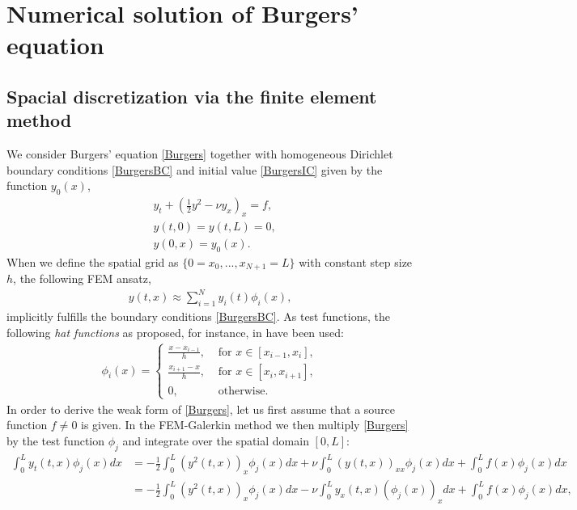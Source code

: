 \chapter{Numerical solution of Burgers' equation}
\label{FEMDiscr}
\section{Spacial discretization via the finite element method}
\label{FEMDiscr_space}
We consider Burgers' equation \eqref{Burgers} together with homogeneous Dirichlet boundary conditions \eqref{BurgersBC} and initial value \eqref{BurgersIC} given by the function $y_0(x)$,
\begin{align}
\label{Burgers}
&y_t + \left( \frac{1}{2} y^2 - \nu y_x \right)_x = f, \\
\label{BurgersBC}
&y(t,0) = y(t,L) = 0,\\
\label{BurgersIC}
&y(0,x) = y_0(x).
\end{align}
When we define the spatial grid as $\{0=x_0,...,x_{N+1}=L\}$ with constant step size $h$, the following FEM ansatz,
\begin{align}
\label{FEMansatz}
y(t,x) \approx \sum_{i=1}^N y_i(t) \phi_i(x),
\end{align}
implicitly fulfills the boundary conditions \eqref{BurgersBC}. As test functions, the following \textit{hat functions} as proposed, for instance, in \cite{FEMbook} have been used:
\begin{align*}
\phi_i(x) = \begin{cases} \frac{x-x_{i-1}}{h}, & \text{ for } x \in [x_{i-1},x_i], \\ \frac{x_{i+1}-x}{h}, & \text{ for } x \in [x_i,x_{i+1}], \\ 0, & \text{ otherwise.}\end{cases}
\end{align*}
In order to derive the weak form of \eqref{Burgers}, let us first assume that a source function $f \neq 0$ is given. In the FEM-Galerkin method we then multiply \eqref{Burgers} by the test function $\phi_j$ and integrate over the spatial domain $[0,L]$:
\begin{align*}
\int_0^L y_t(t,x) \phi_j(x) dx &= -\frac{1}{2} \int_0^L \left( y^2(t,x) \right)_x \phi_j(x) dx + \nu \int_0^L \left( y(t,x) \right)_{xx} \phi_j(x) dx + \int_0^L f(x) \phi_j(x) dx\\
 &= -\frac{1}{2} \int_0^L \left( y^2(t,x) \right)_x \phi_j(x) dx - \nu \int_0^L y_x(t,x) \left( \phi_j(x) \right)_x dx + \int_0^L f(x) \phi_j(x) dx,
\end{align*}
